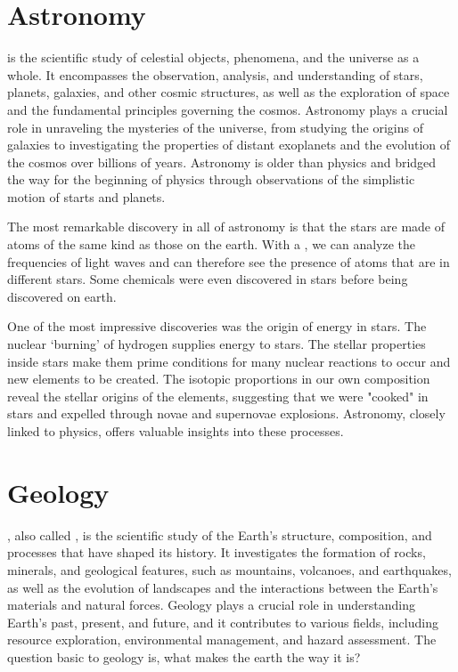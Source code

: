 \section{Astronomy}

 is the scientific study of celestial objects, phenomena, and the universe as a whole. It encompasses the observation, analysis, and understanding of stars, planets, galaxies, and other cosmic structures, as well as the exploration of space and the fundamental principles governing the cosmos. Astronomy plays a crucial role in unraveling the mysteries of the universe, from studying the origins of galaxies to investigating the properties of distant exoplanets and the evolution of the cosmos over billions of years. Astronomy is older than physics and bridged the way for the beginning of physics through observations of the simplistic motion of starts and planets. 

The most remarkable discovery in all of astronomy is that the stars are made of atoms of the same kind as those on the earth. With a , we can analyze the frequencies of light waves and can therefore see the presence of atoms that are in different stars. Some chemicals were even discovered in stars before being discovered on earth.

One of the most impressive discoveries was the origin of energy in stars. The nuclear `burning' of hydrogen supplies energy to stars. The stellar properties inside stars make them prime conditions for many nuclear reactions to occur and new elements to be created. The isotopic proportions in our own composition reveal the stellar origins of the elements, suggesting that we were "cooked" in stars and expelled through novae and supernovae explosions. Astronomy, closely linked to physics, offers valuable insights into these processes.










\section{Geology}

, also called , is the scientific study of the Earth's structure, composition, and processes that have shaped its history. It investigates the formation of rocks, minerals, and geological features, such as mountains, volcanoes, and earthquakes, as well as the evolution of landscapes and the interactions between the Earth's materials and natural forces. Geology plays a crucial role in understanding Earth's past, present, and future, and it contributes to various fields, including resource exploration, environmental management, and hazard assessment. The question basic to geology is, what makes the earth the way it is?

